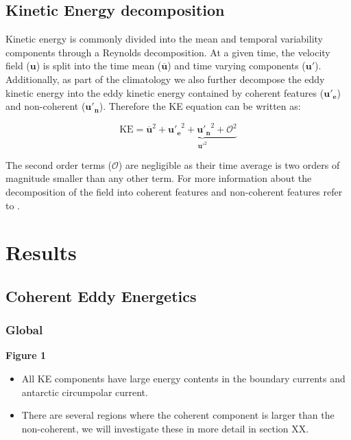 \documentclass[draft,linenumbers]{agujournal2019}
\begin{document}
	\subsection{Kinetic Energy decomposition}

	Kinetic energy is commonly divided into the mean and temporal variability components through a Reynolds decomposition. At a given time, the velocity field ($\mathbf{u}$) is split into the time mean ($\mathbf{\overline{u}}$) and time varying components ($\mathbf{u'}$). Additionally, as part of the climatology we also further decompose the eddy kinetic energy into the eddy kinetic energy contained by coherent features ($\mathbf{u'_e}$) and non-coherent ($\mathbf{u'_n}$). Therefore the KE equation can be written as:
	
	\begin{equation}
		\mathrm{KE}= \mathbf{\overline{u}}^2 +\underbrace{ \mathbf{u'_e}^2+ \mathbf{u'_n}^2 + \mathcal{O}^2}_{\mathbf{u'}^2}
	\end{equation}
	
	The second order terms ($\mathcal{O}$) are negligible as their time average is two orders of magnitude smaller than any other term. For more information about the decomposition of the field into coherent features and non-coherent features refer to \citet{Martinez_Kinetic_2019}.

	\section{Results}
	\label{sec:Results}
	
	\subsection{Coherent Eddy Energetics}
	\label{subsec:R_season}
	
	\subsubsection{Global}


	\textbf{Figure 1}
	\begin{itemize}
		\item All KE components have large energy contents in the boundary currents and antarctic circumpolar current. 
		\item There are several regions where the coherent component is larger than the non-coherent, we will investigate these in more detail in section XX.
	\end{itemize}
\end{document}
